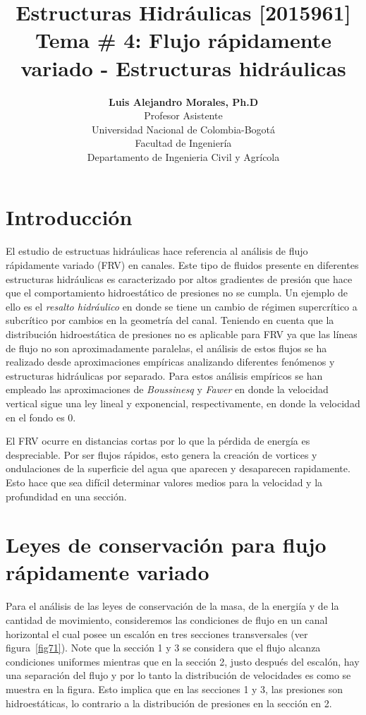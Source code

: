 \documentclass[11pt, oneside]{article}
\title{Estructuras Hidr\'aulicas [2015961] \\ \textbf{Tema \# 4: Flujo r\'apidamente variado - Estructuras hidr\'aulicas}}
\author{\textbf{Luis Alejandro Morales, Ph.D}\\ \vspace{0.4cm} Profesor Asistente \\ Universidad Nacional de Colombia-Bogot\'a\\Facultad de Ingenier\'ia \\ Departamento de Ingenieria Civil y Agr\'icola}
\date{}
\begin{document}
\maketitle
\tableofcontents


\section{Introducci\'on} %
El estudio de estructuas hidr\'aulicas hace referencia al an\'alisis de flujo r\'apidamente variado (FRV) en canales. Este tipo de fluidos presente en diferentes estructuras hidr\'aulicas es caracterizado por altos gradientes de presi\'on que hace que el comportamiento hidroest\'atico de presiones no se cumpla. Un ejemplo de ello es el \emph{resalto hidr\'aulico} en donde se tiene un cambio de r\'egimen supercr\'itico a subcr\'itico por cambios en la geometr\'ia del canal. Teniendo en cuenta que la distribuci\'on hidroest\'atica de presiones no es aplicable para FRV ya que las l\'ineas de flujo no son aproximadamente paralelas, el an\'alisis de estos flujos se ha realizado desde aproximaciones emp\'iricas analizando diferentes fen\'omenos y estructuras hidr\'aulicas por separado. Para estos an\'alisis emp\'iricos se han empleado las aproximaciones de \emph{Boussinesq} y \emph{Fawer} en donde la velocidad vertical sigue una ley lineal y exponencial, respectivamente, en donde la velocidad en el fondo es 0. 

El FRV ocurre en distancias cortas por lo que la p\'erdida de energ\'ia es despreciable. Por ser flujos r\'apidos, esto genera la creaci\'on de vortices y ondulaciones de la superficie del agua que aparecen y desaparecen rapidamente. Esto hace que sea dif\'icil determinar valores medios para la velocidad y la profundidad en una secci\'on.  


\section{Leyes de conservaci\'on para flujo r\'apidamente variado}
Para el an\'alisis de las leyes de conservaci\'on de la masa, de la energi\'ia y de la cantidad de movimiento, consideremos las condiciones de flujo en un canal horizontal el cual posee un escal\'on en tres secciones transversales (ver figura~\ref{fig71}). Note que la secci\'on 1 y 3 se considera que el flujo alcanza condiciones uniformes mientras que en la secci\'on 2, justo despu\'es del escal\'on, hay una separaci\'on del flujo y por lo tanto la distribuci\'on de velocidades es como se muestra en la figura. Esto implica que en las secciones 1 y 3, las presiones son hidroest\'aticas, lo contrario a la distribuci\'on de presiones en la secci\'on en 2. 
\end{document}
